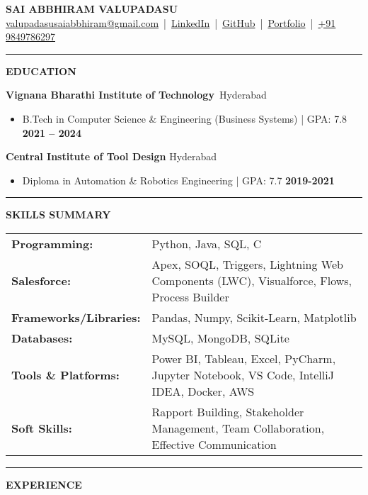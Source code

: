 \documentclass[11pt,a4paper]{article}
\newcommand{\resumesection}[1]{
	\vspace{0.2cm}
	\hrule
	\vspace{0.2cm}
	\centerline{\large\textbf{#1}}
	\vspace{0.15cm}
}
\begin{document}
	
	
	\noindent
	\begin{center}
		\textbf{\Huge SAI ABBHIRAM VALUPADASU} \\[0.3em]
		\href{mailto:valupadasusaiabbhiram@gmail.com}{valupadasusaiabbhiram@gmail.com} \,|\, 
		\href{https://www.linkedin.com/in/sai-abbhiram-valupadasu/}{LinkedIn} \,|\, 
		\href{https://github.com/ValupadasuSaiAbbhiram}{GitHub} \,|\, 
		\href{https://saiabbhiram-portfolio.vercel.app}{Portfolio} \,|\,
		\href{tel:+919849786297}{+91 9849786297}
	\end{center}
	
	
	\resumesection{EDUCATION}
	
		\noindent \textbf{Vignana Bharathi Institute of Technology}\ \hfill Hyderabad
		\begin{itemize}
			\item B.Tech in Computer Science \& Engineering (Business Systems) | GPA: 7.8 \textbf{\hfill 2021 -- 2024}
		\end{itemize}
		
		\noindent \textbf{Central Institute of Tool Design} \hfill Hyderabad
		\begin{itemize}
			\item Diploma in Automation \& Robotics Engineering | GPA: 7.7 \textbf{\hfill 2019-2021}
		\end{itemize}
	
	\resumesection{SKILLS SUMMARY}
	\noindent \begin{tabularx}{\textwidth}{@{}lX@{}}
		\textbf{Programming:} & Python, Java, SQL, C \\
		\textbf{Salesforce:} & Apex, SOQL, Triggers, Lightning Web Components (LWC), Visualforce, Flows, Process Builder \\
		\textbf{Frameworks/Libraries:} & Pandas, Numpy, Scikit-Learn, Matplotlib \\
		\textbf{Databases:} & MySQL, MongoDB, SQLite \\
		\textbf{Tools \& Platforms:} & Power BI, Tableau, Excel, PyCharm, Jupyter Notebook, VS Code, IntelliJ IDEA, Docker, AWS \\
		\textbf{Soft Skills:} & Rapport Building, Stakeholder Management, Team Collaboration, Effective Communication \\
	\end{tabularx}

	\resumesection{EXPERIENCE}
	
\end{document}
